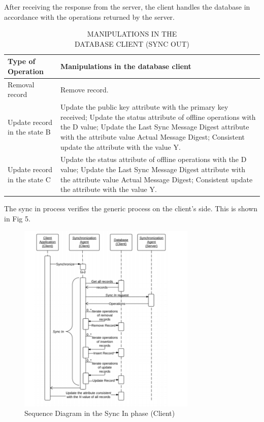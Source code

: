 \documentclass[conference]{IEEEtran}
\begin{document}
\begin{enumerate}[label=(\Alph*)]
After receiving the response from the server, the client handles the database in accordance with the operations returned by the server.

\begin{table}[h!]
\centering
\caption{MANIPULATIONS IN THE \\ DATABASE CLIENT (SYNC OUT) }
\setlength\tabcolsep{8pt}
\begin{tabular}{ | m{5em} | m{15em}| } 
\hline
\textbf{Type of Operation} & \textbf{Manipulations in the database client } \\
\hline
Removal record& Remove record. \\ 
\hline
Update record in the state B  & Update the public key attribute with the primary
key received;
Update the status attribute of offline operations
with the D value;
Update the Last Sync Message Digest attribute
with the attribute value Actual Message Digest;
Consistent update the attribute with the value Y.  \\ 
\hline
Update record in the state C  & Update the status attribute of offline operations
with the D value;
Update the Last Sync Message Digest attribute
with the attribute value Actual Message Digest;
Consistent update the attribute with the value Y.   \\ 
\hline 
\end{tabular}
\label{table:3}
\end{table}

The sync in process verifies the generic process on the client's side. This is shown in Fig 5. 

\begin{figure}[h]
	\centering
	\includegraphics[trim={1cm 0 1cm 0},clip, width=8.5cm]{sync-in.png} 
	\caption{Sequence Diagram in the Sync In phase (Client)}
	\label{fig:sync-in1}
\end{figure}



\end{enumerate}
\end{document}
